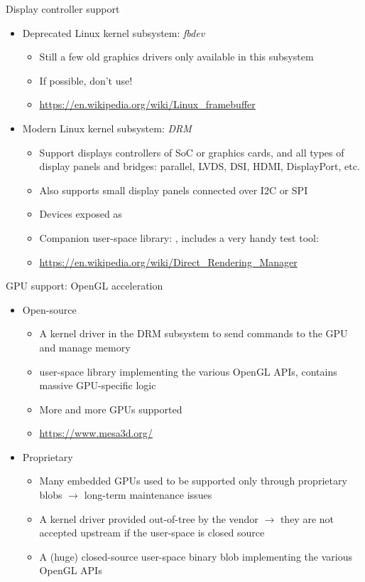 \begin{frame}{Display controller support}
  \begin{itemize}
  \item Deprecated Linux kernel subsystem: {\em fbdev}
    \begin{itemize}
    \item Still a few old graphics drivers only available in this subsystem
    \item If possible, don't use!
    \item \url{https://en.wikipedia.org/wiki/Linux_framebuffer}
    \end{itemize}
  \item Modern Linux kernel subsystem: {\em DRM}
    \begin{itemize}
    \item Support displays controllers of SoC or graphics cards, and
      all types of display panels and bridges: parallel, LVDS, DSI,
      HDMI, DisplayPort, etc.
    \item Also supports small display panels connected over I2C or SPI
    \item Devices exposed as 
    \item Companion user-space library: , includes a very
      handy test tool: 
    \item \url{https://en.wikipedia.org/wiki/Direct_Rendering_Manager}
    \end{itemize}
  \end{itemize}
\end{frame}

\begin{frame}{GPU support: OpenGL acceleration}
  \begin{itemize}
  \item Open-source
    \begin{itemize}
    \item A kernel driver in the DRM subsystem to send commands to the
      GPU and manage memory
    \item {} user-space library implementing the various
      OpenGL APIs, contains massive GPU-specific logic
    \item More and more GPUs supported
    \item \url{https://www.mesa3d.org/}
    \end{itemize}
  \item Proprietary
    \begin{itemize}
    \item Many embedded GPUs used to be supported only through
      proprietary blobs $\rightarrow$ long-term maintenance issues
    \item A kernel driver provided out-of-tree by the vendor
      $\rightarrow$ they are not accepted upstream if the user-space
      is closed source
    \item A (huge) closed-source user-space binary blob implementing
      the various OpenGL APIs
    \end{itemize}
  \end{itemize}
\end{frame}

